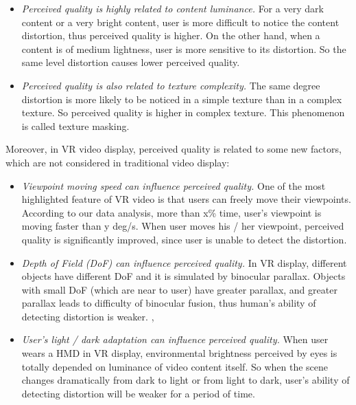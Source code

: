 \begin{itemize}

\item \emph{Perceived quality is highly related to content luminance.} For a very dark content or a very bright content, user is more difficult to notice the content distortion, thus perceived quality is higher. On the other hand, when a content is of medium lightness, user is more sensitive to its distortion. So the same level distortion causes lower perceived quality.

\item \emph{Perceived quality is also related to texture complexity.} The same degree distortion is more likely to be noticed in a simple texture than in a complex texture. So perceived quality is higher in complex texture. This phenomenon is called texture masking.

\end{itemize}

Moreover, in VR video display, perceived quality is related to some new factors, which are not considered in traditional video display:

\begin{itemize}

\item \emph{Viewpoint moving speed can influence perceived quality.} One of the most highlighted feature of VR video is that users can freely move their viewpoints. According to our data analysis, more than x\% time, user's viewpoint is moving faster than y deg/s. When user moves his / her viewpoint, perceived quality is significantly improved, since user is unable to detect the distortion. \cite{speed}

\item \emph{Depth of Field (DoF) can influence perceived quality.} In VR display, different objects have different DoF and it is simulated by binocular parallax. Objects with small DoF (which are near to user) have greater parallax, and greater parallax leads to difficulty of binocular fusion, thus human's ability of detecting distortion is weaker. \cite{DoF1}, \cite{DoF2}

\item \emph{User's light / dark adaptation can influence perceived quality.} When user wears a HMD in VR display, environmental brightness perceived by eyes is totally depended on luminance of video content itself. So when the scene changes dramatically from dark to light or from light to dark, user's ability of detecting distortion will be weaker for a period of time. \cite{adaptation1}

\end{itemize}

